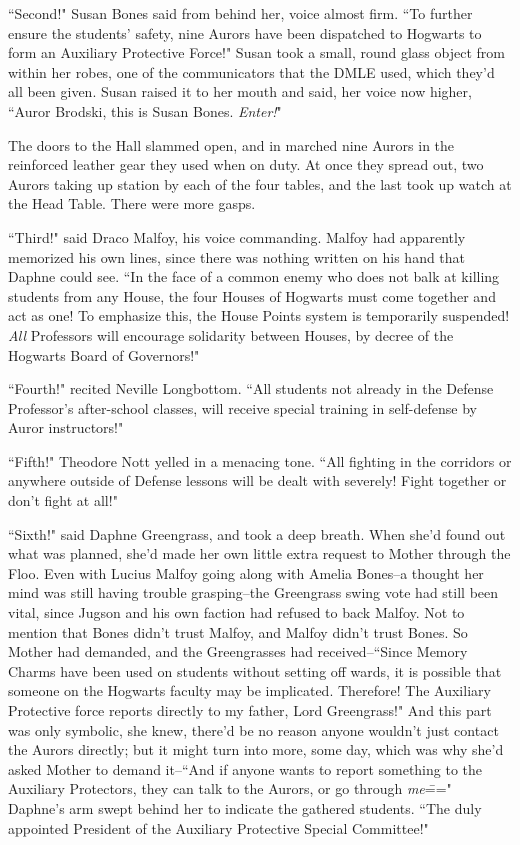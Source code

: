 ``Second!" Susan Bones said from behind her, voice almost firm. ``To further ensure the students' safety, nine Aurors have been dispatched to Hogwarts to form an Auxiliary Protective Force!" Susan took a small, round glass object from within her robes, one of the communicators that the DMLE used, which they'd all been given. Susan raised it to her mouth and said, her voice now higher, ``Auror Brodski, this is Susan Bones. \emph{Enter!}"

The doors to the Hall slammed open, and in marched nine Aurors in the reinforced leather gear they used when on duty. At once they spread out, two Aurors taking up station by each of the four tables, and the last took up watch at the Head Table. There were more gasps.

``Third!" said Draco Malfoy, his voice commanding. Malfoy had apparently memorized his own lines, since there was nothing written on his hand that Daphne could see. ``In the face of a common enemy who does not balk at killing students from any House, the four Houses of Hogwarts must come together and act as one! To emphasize this, the House Points system is temporarily suspended! \emph{All} Professors will encourage solidarity between Houses, by decree of the Hogwarts Board of Governors!"

``Fourth!" recited Neville Longbottom. ``All students not already in the Defense Professor's after-school classes, will receive special training in self-defense by Auror instructors!"

``Fifth!" Theodore Nott yelled in a menacing tone. ``All fighting in the corridors or anywhere outside of Defense lessons will be dealt with severely! Fight together or don't fight at all!"

``Sixth!" said Daphne Greengrass, and took a deep breath. When she'd found out what was planned, she'd made her own little extra request to Mother through the Floo. Even with Lucius Malfoy going along with Amelia Bones\---a thought her mind was still having trouble grasping\---the Greengrass swing vote had still been vital, since Jugson and his own faction had refused to back Malfoy. Not to mention that Bones didn't trust Malfoy, and Malfoy didn't trust Bones. So Mother had demanded, and the Greengrasses had received\---``Since Memory Charms have been used on students without setting off wards, it is possible that someone on the Hogwarts faculty may be implicated. Therefore! The Auxiliary Protective force reports directly to my father, Lord Greengrass!" And this part was only symbolic, she knew, there'd be no reason anyone wouldn't just contact the Aurors directly; but it might turn into more, some day, which was why she'd asked Mother to demand it\---``And if anyone wants to report something to the Auxiliary Protectors, they can talk to the Aurors, or go through \emph{me}\===" Daphne's arm swept behind her to indicate the gathered students. ``The duly appointed President of the Auxiliary Protective Special Committee!"

